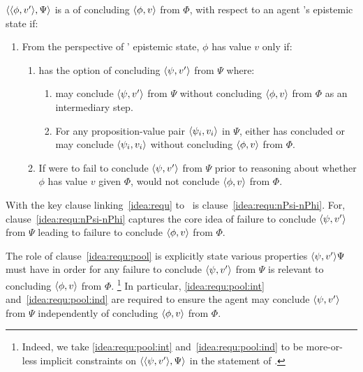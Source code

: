 \begin{note}
  \begin{idea}[\iRequ{}]
    \label{idea:requ}
    \(\langle \langle \phi, v' \rangle, \Psi \rangle\) is a \emph{\requ{}} of concluding \(\langle \phi, v \rangle\) from \(\Phi\), with respect to an agent \vAgent{}'s epistemic state if:
    \begin{enumerate}
    \item
      \label{idea:requ:main}
      From the perspective of \vAgent{}' epistemic state, \(\phi\) has value \(v\) only if:
      \begin{enumerate}[label=\alph*., ref=\named{R:\alph*}]
      \item
        \label{idea:requ:pool}
        \vAgent{} has the option of concluding \(\langle \psi, v' \rangle\) from \(\Psi\) where:
        \begin{enumerate}[label=\roman*., ref=\named{R:a.\roman*}, series=csIdeaCounter]
        \item
          \label{idea:requ:pool:int}
          \vAgent{} may conclude \(\langle \psi, v' \rangle\) from \(\Psi\) without concluding \(\langle \phi, v \rangle\) from \(\Phi\) as an intermediary step.
        \item
          \label{idea:requ:pool:ind}
          For any proposition-value pair \(\langle \psi_{i}, v_{i} \rangle\) in \(\Psi\), \vAgent{} either has concluded or may conclude \(\langle \psi_{i}, v_{i} \rangle\) without concluding \(\langle \phi, v \rangle\) from \(\Phi\).
        \end{enumerate}
      \item
        \label{idea:requ:nPsi-nPhi}
        If \vAgent{} were to fail to conclude \(\langle \psi, v' \rangle\) from \(\Psi\) prior to reasoning about whether \(\phi\) has value \(v\) given \(\Phi\), \vAgent{} would not conclude \(\langle \phi, v \rangle\) from \(\Phi\).
      \end{enumerate}
    \end{enumerate}
    \vspace{-\baselineskip}
  \end{idea}

  With the key clause linking~\autoref{idea:requ} to~\qzS{} is clause~\ref{idea:requ:nPsi-nPhi}.
  For, clause~\ref{idea:requ:nPsi-nPhi} captures the core idea of failure to conclude \(\langle \psi, v' \rangle\) from \(\Psi\) leading to failure to conclude \(\langle \phi, v \rangle\) from \(\Phi\).

  The role of clause~\ref{idea:requ:pool} is explicitly state various properties \(\langle \psi, v' \rangle{\Psi}\) must have in order for any failure to conclude \(\langle \psi, v' \rangle\) from \(\Psi\) is relevant to concluding \(\langle \phi, v \rangle\) from \(\Phi\).%
  \footnote{
    Indeed, we take \ref{idea:requ:pool:int} and~\ref{idea:requ:pool:ind} to be more-or-less implicit constraints on \(\langle \langle \psi, v' \rangle, \Psi \rangle\) in the statement of \qzS{}.
  }
  In particular, \ref{idea:requ:pool:int} and~\ref{idea:requ:pool:ind} are required to ensure the agent may conclude \(\langle \psi, v' \rangle\) from \(\Psi\) independently of concluding \(\langle \phi, v \rangle\) from \(\Phi\).


\end{note}
